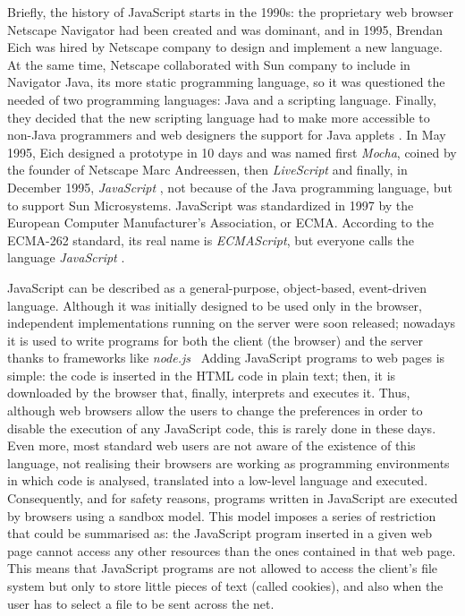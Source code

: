 \documentclass{article}
\begin{document}
Briefly, the history of JavaScript starts in the 1990s: the proprietary web browser Netscape Navigator had been created and was dominant, and in 1995, Brendan Eich was hired by Netscape company to design and implement a new language. At the same time, Netscape collaborated with Sun company to include in Navigator Java, its more static programming language, so it was questioned the needed of two programming languages: Java and a scripting language. Finally, they decided that the new scripting language had to make more accessible to non-Java programmers and web designers the support for Java applets \cite{Champeon08}. In May 1995, Eich designed a prototype in 10 days and was named first \emph{Mocha}, coined by the founder of Netscape Marc Andreessen, then \emph{LiveScript} and finally, in December 1995, \emph{JavaScript} \cite{Eich2010}, not because of the Java programming language, but to support Sun Microsystems.
JavaScript was standardized in 1997 by the European Computer Manufacturer's Association, or ECMA. According to the ECMA-262 standard, its real name is \emph{ECMAScript}, but everyone calls the language \emph{JavaScript} \cite{Flanagan06}.





JavaScript can be described as a general-purpose, object-based,
event-driven language. Although it was initially designed to be used only in the
browser, independent implementations running on the server were soon released; nowadays
it is used to write programs for both the client (the browser) and the
server thanks to frameworks like
\emph{node.js}~\cite{rauch2012smashing}
Adding JavaScript programs to web pages is simple: the code is inserted in the HTML code in plain text; then, it is downloaded by the browser that, finally,  interprets and executes it.
Thus, although web browsers allow the users to change the preferences
in order to disable the execution of any JavaScript code, this is
rarely done in these days. Even more, most standard web users are not
aware of the existence of this language, not realising their browsers
are working as programming environments in which code is analysed,
translated into a low-level language and executed. Consequently, and
for safety reasons, programs written in JavaScript are executed by
browsers using a sandbox model. This model imposes a series of
restriction that could be summarised as: the JavaScript program
inserted in a given web page cannot access any other resources than
the ones contained in that web page. This means that JavaScript programs are not allowed
to access the client's file system but only to store little pieces of text (called
cookies), and also when the user has to select a file to be sent
across the net.
\end{document}
